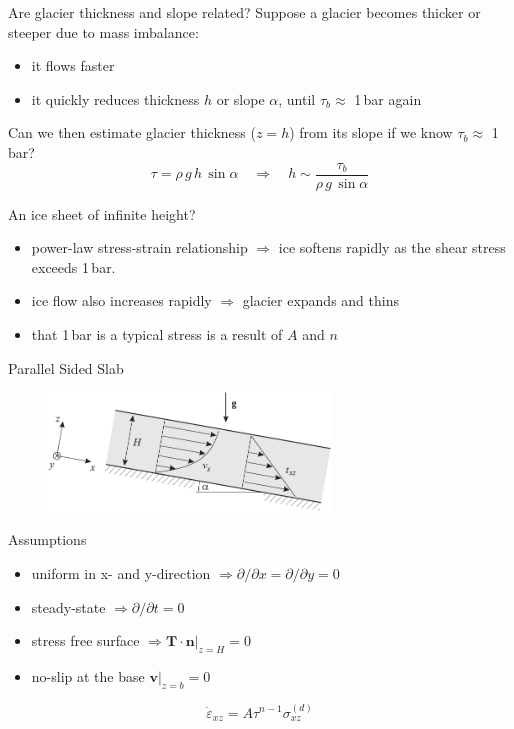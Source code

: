 \documentclass[hide notes,intlimits,unknownkeysallowed]{beamer}
\newcommand{\bn}{\mathbf{n}}
\newcommand{\bv}{\mathbf{v}}
\begin{document}
\begin{frame}{Are glacier thickness and slope related?}
  Suppose a glacier becomes thicker or steeper due to mass imbalance:
  \begin{itemize}
    \item it flows faster
    \item it quickly reduces thickness $h$ or slope $\alpha$, until $\tau_{b} \approx$ 1\,bar again
  \end{itemize}
  Can we then estimate glacier thickness ($z=h$) from its slope if we know $\tau_{b} \approx$ 1\,bar?
  \begin{displaymath}
    \tau = \rho\,g\,h\,\sin{\alpha} \quad \Rightarrow \quad h \sim \frac{\tau_{b}}{\rho\,g\,\sin{\alpha}}
  \end{displaymath}
\end{frame}


\begin{frame}{An ice sheet of infinite height?}
\begin{itemize}
  \item power-law stress-strain relationship $\Rightarrow$ ice softens
    rapidly as the shear stress exceeds 1\,bar.
  \item ice flow also increases rapidly $\Rightarrow$ glacier expands
    and thins
  \item that 1\,bar is a typical stress is a result of $A$ and $n$
\end{itemize}

\end{frame}


\begin{frame}{Parallel Sided Slab}
  \vspace{-1em}
  \begin{figure}
    \includegraphics[width=7.5cm]{fig_3_11}
  \end{figure}
  \vspace{-1em}
  \begin{block}{Assumptions}
    \begin{itemize}
    \item uniform in x- and y-direction $\Rightarrow \partial / \partial x = \partial / \partial y = 0$
    \item steady-state $\Rightarrow \partial / \partial t = 0$
    \item stress free surface $\Rightarrow \mathbf{T}\cdot \bn \vert_{z=H} = 0$
    \item no-slip at the base $\bv \vert_{z=b} = 0$
    \end{itemize}
  \end{block}
  \vspace{.5em}
  \begin{equation*}
    \dot \varepsilon_{xz} = A\tau^{n-1} \sigma_{xz}^{(d)}
  \end{equation*}
\end{frame}
\end{document}
